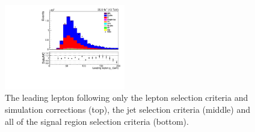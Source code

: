 \begin{figure}[h]
\includegraphics[width=0.47\textwidth]{figs/background-estimation/plots/unblinded/prompt_mumu_ttbarInc/lep1Pt_NPL_mumu_wMass_mumu.pdf}
\caption{
The leading lepton \pT following only the lepton selection criteria and simulation corrections (top), the jet selection criteria (middle) and all of the signal region selection criteria (bottom).
}
\label{fig:SR_lep1Pt}
\end{figure}

